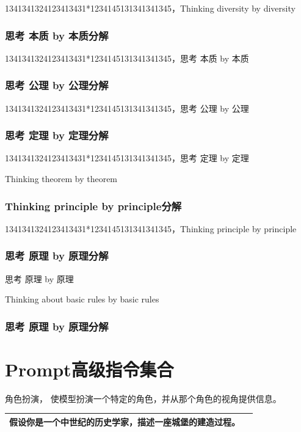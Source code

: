 \documentclass[12pt]{book}
\begin{document}
1341341324123413431*1234145131341341345，Thinking diversity by diversity


\subsection{思考 本质 by 本质分解}

1341341324123413431*1234145131341341345，思考 本质 by 本质


\subsection{思考 公理 by 公理分解}

1341341324123413431*1234145131341341345，思考 公理 by 公理


\subsection{思考 定理 by 定理分解}
1341341324123413431*1234145131341341345，思考 定理 by 定理


Thinking theorem by theorem


\subsection{Thinking principle by principle分解}

1341341324123413431*1234145131341341345，Thinking principle by principle


\subsection{思考 原理 by 原理分解}

思考 原理 by 原理

Thinking about basic rules by basic rules

\subsection{思考 原理 by 原理分解}

\chapter{Prompt高级指令集合}
\bigskip
角色扮演， 使模型扮演一个特定的角色，并从那个角色的视角提供信息。

\begin{tabular}{|p{15cm}|p{3cm}|}
	\hline
假设你是一个中世纪的历史学家，描述一座城堡的建造过程。\\
	\hline
\end{tabular}
\end{document}
